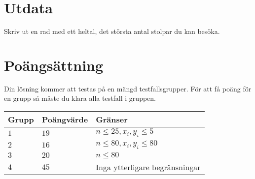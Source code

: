 \section*{Utdata}
Skriv ut en rad med ett heltal, det största antal stolpar du kan besöka.

\section*{Poängsättning}
Din lösning kommer att testas på en mängd testfallsgrupper.
För att få poäng för en grupp så måste du klara alla testfall i gruppen.

\noindent
\begin{tabular}{| l | l | l |}
\hline
Grupp & Poängvärde & Gränser \\ \hline
$1$   & $19$       & $n \leq 25, x_{i}, y_{i} \leq 5$ \\ \hline
$2$   & $16$       & $n \leq 80, x_{i}, y_{i} \leq 80$ \\ \hline
$3$   & $20$       & $n \leq 80$ \\ \hline
$4$   & $45$       & Inga ytterligare begränsningar \\ \hline
\end{tabular}
